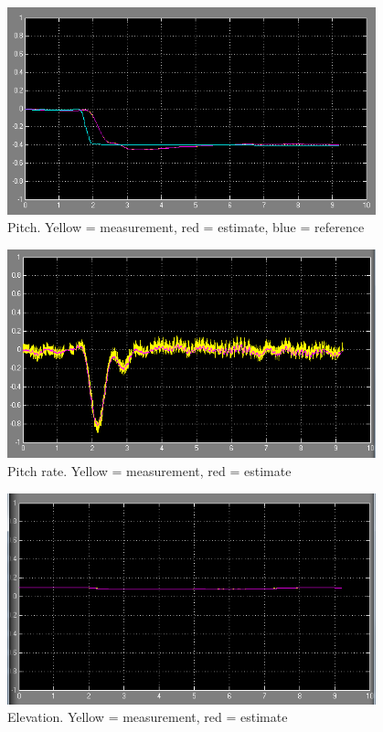 \begin{figure}[H]
	\centering
	\includegraphics[width=0.95\textwidth]{images/est_med_int/p_est.png}
	\caption{Pitch. Yellow = measurement, red = estimate, blue = reference}
	\label{fig:pest}
\end{figure}
\begin{figure}[H]
	\centering
	\includegraphics[width=0.95\textwidth]{images/est_med_int/pd_est.png}
	\caption{Pitch rate. Yellow = measurement, red = estimate}
	\label{fig:pdest}
\end{figure}
\begin{figure}[H]
	\centering
	\includegraphics[width=0.95\textwidth]{images/est_med_int/e_est.png}
	\caption{Elevation. Yellow = measurement, red = estimate}
	\label{fig:eest}
\end{figure}

